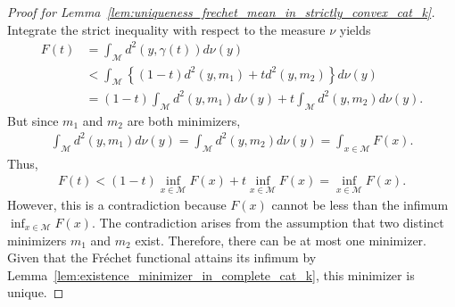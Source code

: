 \begin{proof}[Proof for Lemma~\ref{lem:uniqueness_frechet_mean_in_strictly_convex_cat_k}]
    Integrate the strict inequality with respect to the measure $\nu$ yields
    \begin{align*}
        F(t) &= \int_\mathcal{M} d^2(y, \gamma(t)) d\nu(y) \\
        &< \int_\mathcal{M} \left\{(1 - t) d^2(y, m_1) + t d^2(y, m_2)\right\}d\nu(y) \\
        &= (1 - t) \int_\mathcal{M} d^2(y, m_1)d\nu(y) + t \int_\mathcal{M} d^2(y, m_2) d\nu(y).
    \end{align*}
    But since $m_1$ and $m_2$ are both minimizers,
    \begin{align*}
        \int_\mathcal{M} d^2(y, m_1)d\nu(y) = \int_\mathcal{M} d^2(y, m_2)d\nu(y) = \int_{x \in \mathcal{M}}F(x).
    \end{align*}
    Thus,
    \begin{align*}
        F(t) < (1 - t) \inf_{x \in \mathcal{M}} F(x) + t \inf_{x \in \mathcal{M}} F(x) = \inf_{x \in \mathcal{M}} F(x).
    \end{align*}
    However, this is a contradiction because $F(x)$ cannot be less than the infimum $\inf_{x \in \mathcal{M}} F(x)$.
    The contradiction arises from the assumption that two distinct minimizers $m_1$ and $m_2$ exist.
    Therefore, there can be at most one minimizer.
    Given that the Fréchet functional attains its infimum by Lemma~\ref{lem:existence_minimizer_in_complete_cat_k}, this minimizer is unique.
\end{proof}

